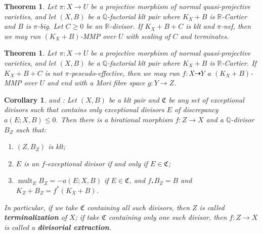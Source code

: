\documentclass[11pt]{amsart}
\newtheorem{thm}[defn]{Theorem}
\newtheorem{cor}[defn]{Corollary}
\begin{document}
\begin{thm}
\cite[Corollary 1.4.2]{BCHM10} Let $ \pi:X\to U $ be a projective morphism of normal quasi-projective varieties, and let $(X,B)$ be a $\mathbb{Q}$-factorial klt pair where $K_{X}+B$ is $\mathbb{R}$-Cartier and $B$ is $\pi$-big. Let $C\geqslant0$ be an $\mathbb{R}$-divisor. If $K_{X}+B+C$ is klt and  $\pi$-nef, then we may run $(K_{X}+B)$-MMP over $U$  with scaling of $C$ and  terminates.
\end{thm}

\begin{thm}\label{notpseudoeffmfs}
  \cite[Corollary 1.3.3]{BCHM10} Let $ \pi:X\to U $ be a projective morphism of normal quasi-projective varieties, and let $(X,B)$ be a $\mathbb{Q}$-factorial klt pair where $K_{X}+B$ is $\mathbb{R}$-Cartier.  If $K_{X}+B+C$ is  not $\pi$-peseudo-effective, then we may run $f:X\dashrightarrow Y$ a $(K_{X}+B)$-MMP over   $U$ and end with a Mori fibre space $g:Y\to Z$.
\end{thm}

\begin{cor}\label{extraction}
  \cite[Corollary 13.7]{haconMinimalModelProgram2012} and \cite[Corollary 1.4.3]{BCHM10}: Let $ (X,B) $ be a  klt pair and $\mathfrak{C}$ be any set of exceptional divisors such that  contains only exceptional divisors $ E $ of discrepancy $ a(E;X,B)\leqslant 0 $. Then there is a birational morphism $ f:Z\to X $ and a $ \mathbb{Q} $-divisor $ B_Z $ such that:
  \begin{enumerate}
    \item $ (Z,B_Z) $ is klt;
    \item $ E $ is an $f$-exceptional divisor if and only if $ E\in \mathfrak{C} $;
    \item $ \operatorname{mult}_{E}B_Z=-a(E;X,B) $ if $E \in \mathfrak{C}$, and $ f_*B_Z=B $ and $ K_Z+B_Z=f^*(K_X+B) $.
  \end{enumerate} 
  In particular, if we take $\mathfrak{C}$ containing all such divisors, then $ Z $ is called \textbf{terminalization} of $ X $; if take $\mathfrak{C}$ containing only one such divisor, then $ f:Z\to X $ is called a \textbf{divisorial extraction}.    
\end{cor}
\end{document}
